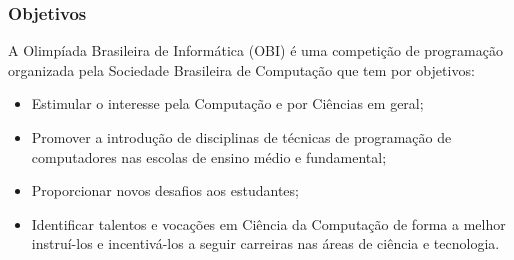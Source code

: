 \begin{frame}
 \frametitle{Objetivos}
 A Olimpíada Brasileira de Informática (OBI) é uma competição de programação organizada
 pela Sociedade Brasileira de Computação que tem por objetivos:
 \begin{itemize}
  \item Estimular o interesse pela Computação e por Ciências em geral;
  \item Promover a introdução de disciplinas de técnicas de programação
  de computadores nas escolas de ensino médio e fundamental;
  \item Proporcionar novos desafios aos estudantes;
  \item Identificar talentos e vocações em Ciência da Computação de
  forma a melhor instruí-los e incentivá-los a seguir
  carreiras nas áreas de ciência e tecnologia. 
 \end{itemize}
\end{frame}
